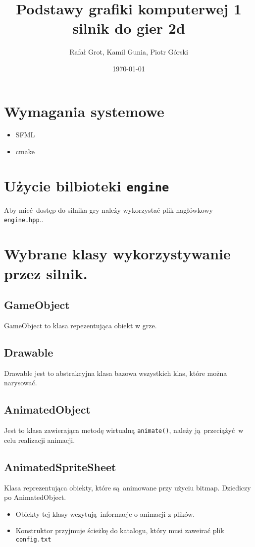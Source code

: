 \documentclass[11pt]{article}
\author{Rafał Grot, Kamil Gunia, Piotr Górski}
\date{\today}
\title{Podstawy grafiki komputerwej 1 silnik do gier 2d}
\begin{document}
\maketitle
\tableofcontents

\newpage
\section{Wymagania systemowe}
\label{sec:org7b065c9}
\begin{itemize}
\item SFML
\item cmake
\end{itemize}
\section{Użycie bilbioteki \texttt{engine}}
\label{sec:org2f6b2f0}
Aby mieć dostęp do silnika gry należy wykorzystać plik nagłówkowy \texttt{engine.hpp}..
\section{Wybrane klasy wykorzystywanie przez silnik.}
\label{sec:org67393b2}
\subsection{GameObject}
\label{sec:org3ef4a7c}
GameObject to klasa repezentująca obiekt w grze.
\subsection{Drawable}
\label{sec:org8ad77fe}
Drawable jest to abstrakcyjna klasa bazowa wszystkich klas, które można narysować.
\subsection{AnimatedObject}
\label{sec:org42dce6c}
Jest to klasa zawierająca metodę wirtualną \texttt{animate()}, należy ją przeciążyć w celu realizacji animacji.
\subsection{AnimatedSpriteSheet}
\label{sec:orgb54e728}
Klasa reprezentująca obiekty, które są animowane przy użyciu bitmap. Dziediczy po AnimatedObject.

\begin{itemize}
\item Obiekty tej klasy wczytują informacje o animacji z plików.

\item Konstruktor przyjmuje ścieżkę do katalogu, który musi zaweirać plik \texttt{config.txt}
\end{itemize}
\end{document}
